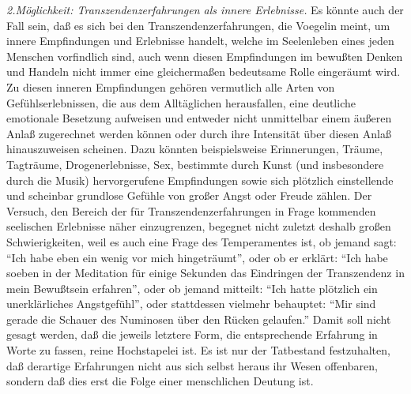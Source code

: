{\it 2.Möglichkeit: Transzendenzerfahrungen als innere Erlebnisse.} Es könnte
auch der Fall sein, daß es sich bei den Transzendenzerfahrungen, die Voegelin
meint, um innere Empfindungen und Erlebnisse handelt, welche im Seelenleben
eines jeden Menschen vorfindlich sind, auch wenn diesen Empfindungen im
bewußten Denken und Handeln nicht immer eine gleichermaßen bedeutsame Rolle
eingeräumt wird. Zu diesen inneren Empfindungen gehören vermutlich alle Arten
von Gefühlserlebnissen, die aus dem Alltäglichen herausfallen, eine deutliche
emotionale Besetzung aufweisen und entweder nicht unmittelbar einem äußeren
Anlaß zugerechnet werden können oder durch ihre Intensität über diesen Anlaß
hinauszuweisen scheinen. Dazu könnten beispielsweise Erinnerungen, Träume,
Tagträume, Drogenerlebnisse, Sex, bestimmte durch Kunst (und insbesondere
durch die Musik) hervorgerufene Empfindungen sowie sich plötzlich
einstellende und scheinbar grundlose Gefühle von großer Angst oder Freude
zählen. Der Versuch, den Bereich der für Transzendenzerfahrungen in Frage
kommenden seelischen Erlebnisse näher einzugrenzen, begegnet nicht zuletzt
deshalb großen Schwierigkeiten, weil es auch eine Frage des Temperamentes ist,
ob jemand sagt: "`Ich habe eben ein wenig vor mich hingeträumt"', oder ob er
erklärt: "`Ich habe soeben in der Meditation für einige Sekunden das
Eindringen der Transzendenz in mein Bewußtsein erfahren"', oder ob jemand
mitteilt: "`Ich hatte plötzlich ein unerklärliches Angstgefühl"', oder
stattdessen vielmehr behauptet: "`Mir sind gerade die Schauer des Numinosen
über den Rücken gelaufen."' Damit soll nicht gesagt werden, daß die jeweils
letztere Form, die entsprechende Erfahrung in Worte zu fassen, reine
Hochstapelei ist. Es ist nur der Tatbestand festzuhalten, daß derartige
Erfahrungen nicht aus sich selbst heraus ihr Wesen offenbaren, sondern daß
dies erst die Folge einer menschlichen Deutung ist.

